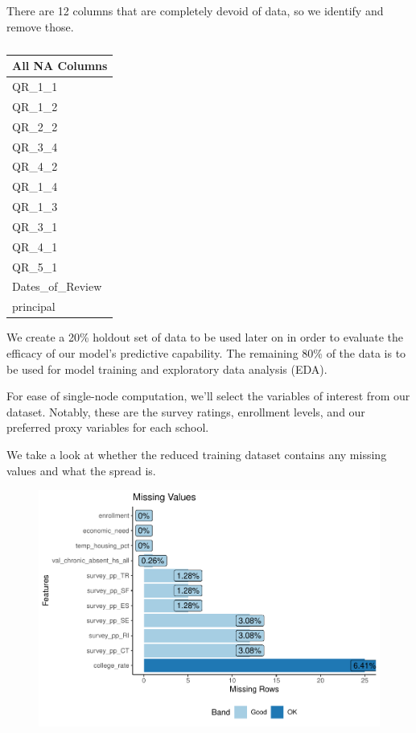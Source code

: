 \documentclass[
  man,floatsintext]{apa6}
\begin{document}
There are 12 columns that are completely devoid of data, so we identify and remove those.

\begin{table}[H]

\begin{center}
\begin{threeparttable}

\caption{\label{tab:unnamed-chunk-2}}

\begin{tabular}{l}
\toprule
All NA Columns\\
\midrule
QR\_1\_1\\
QR\_1\_2\\
QR\_2\_2\\
QR\_3\_4\\
QR\_4\_2\\
QR\_1\_4\\
QR\_1\_3\\
QR\_3\_1\\
QR\_4\_1\\
QR\_5\_1\\
Dates\_of\_Review\\
principal\\
\bottomrule
\end{tabular}

\end{threeparttable}
\end{center}

\end{table}

We create a 20\% holdout set of data to be used later on in order to evaluate the efficacy of our model's predictive capability. The remaining 80\% of the data is to be used for model training and exploratory data analysis (EDA).

For ease of single-node computation, we'll select the variables of interest from our dataset. Notably, these are the survey ratings, enrollment levels, and our preferred proxy variables for each school.

We take a look at whether the reduced training dataset contains any missing values and what the spread is.

\begin{figure}[H]
\includegraphics[width=\textwidth]{final-project_files/figure-latex/data4-1} \caption{ }\label{fig:data4}
\end{figure}
\end{document}
